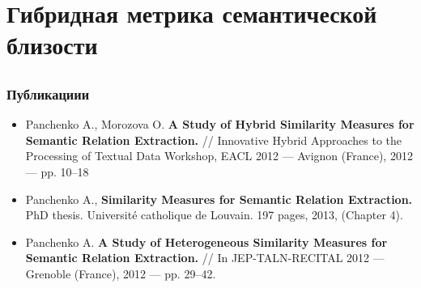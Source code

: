 
\section[HybridSim]{Гибридная метрика семантической близости}

\subsection{}

\begin{frame}
\frametitle{Публикациии}
\begin{itemize}
\item Panchenko A., Morozova O. \textbf{A Study of Hybrid Similarity Measures
for Semantic Relation Extraction.} // Innovative Hybrid Approaches to the Processing of Textual Data Workshop, EACL 2012 — Avignon (France), 2012 — pp. 10–18 
\item Panchenko A., \textbf{Similarity Measures for Semantic Relation
Extraction.} PhD thesis. Universit\'{e} catholique de Louvain. 197
pages, 2013, (Chapter 4). 

\item Panchenko A. \textbf{A Study of Heterogeneous Similarity Measures for
Semantic Relation Extraction.} // In JEP-TALN-RECITAL 2012 — Grenoble (France), 2012 — pp. 29–42.
\end{itemize}
\end{frame}





